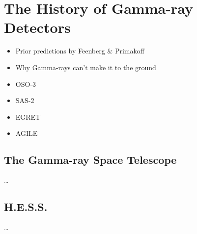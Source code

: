 
\section{The History of Gamma-ray Detectors}

\begin{itemize}
  \item Prior predictions by Feenberg \& Primakoff
  \item Why Gamma-rays can't make it to the ground
  \item OSO-3
  \item SAS-2
  \item EGRET
  \item AGILE
\end{itemize}

\subsection{The \fermi Gamma-ray Space Telescope}

\ldots


\subsection{H.E.S.S.}

\ldots

